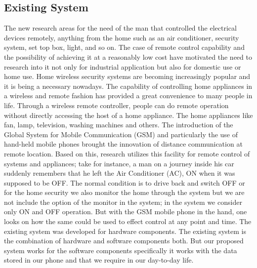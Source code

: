 \subsection{Existing System}
\hspace{0.9cm}
The new research areas for the need of the man that
controlled the electrical devices remotely, anything
from
the home such as an air conditioner, security system,
set top box, light, and so on. The case of remote
control capability and the possibility of achieving it at
a reasonably low cost have motivated the need to
research into it not only for industrial application but
also for domestic use or home use. Home wireless
security systems are becoming increasingly popular
and it is being a necessary nowadays.
The capability of controlling home
appliances in a wireless and remote fashion has
provided a great convenience to many people in life.
Through a wireless remote controller, people can do
remote operation without directly accessing the host of
a home appliance. The home appliances like fan,
lamp, television, washing machines and others. The
introduction of the Global System for Mobile
Communication (GSM) and particularly the use of
hand-held mobile phones brought the innovation of
distance communication at remote location. Based on
this, research utilizes this facility for remote control of
systems and appliances; take for instance, a man on a
journey inside his car suddenly remembers that he left
the Air Conditioner (AC), ON when it was supposed
to be OFF. The normal condition is to drive back and
switch OFF or for the home security we also monitor
the home through the system but we are not include
the option of the monitor in the system; in the system
we consider only ON and OFF operation. But with the
GSM mobile phone in the hand, one looks on how the
same could be used to effect control at any point and
time. The existing system was developed for hardware components. The existing system is the
combination of hardware and software components
both. But our proposed system works for the software
components specifically it works with the data stored
in our phone and that we require in our day-to-day
life.

